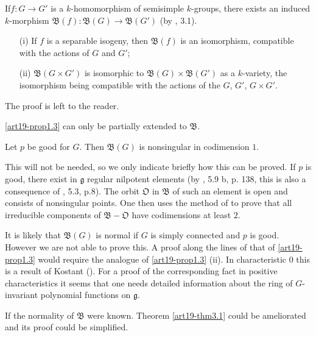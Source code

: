 If\pageoriginale $f:G\to G'$ is a $k$-homomorphism of semisimple $k$-groups, there exists an induced $k$-morphism $\mathfrak{B}(f):\mathfrak{B}(G)\to \mathfrak{B}(G')$ (by \cite{art19-key2}, 3.1).

\begin{proposition}\label{art19-prop2.2}
\begin{itemize}
\item[\rm(i)] If $f$ is a separable isogeny, then $\mathfrak{B}(f)$ is an isomorphism, compatible with the actions of $G$ and $G'$;

\item[\rm(ii)] $\mathfrak{B}(G\times G')$ is isomorphic to $\mathfrak{B}(G)\times \mathfrak{B}(G')$ as a $k$-variety, the isomorphism being compatible with the actions of the $G$, $G'$, $G\times G'$.
\end{itemize}
\end{proposition}

The proof is left to the reader.

\ref{art19-prop1.3} can only be partially extended to $\mathfrak{B}$.

\begin{proposition}\label{prop2.3}
Let $p$ be good for $G$. Then $\mathfrak{B}(G)$ is nonsingular in codimension $1$.
\end{proposition}

This will not be needed, so we only indicate briefly how this can be proved. If $p$ is good, there exist in $\mathfrak{g}$ regular nilpotent elements (by \cite{art19-key14}, 5.9 b, p. 138, this is also a consequence of \cite{art19-key10}, 5.3, p.8). The orbit $\mathfrak{O}$ in $\mathfrak{B}$ of such an element is open and consists of nonsingular points. One then uses the method of \cite{art19-key15} to prove that all irreducible components of $\mathfrak{B}-\mathfrak{O}$ have codimensions at least $2$.

It is likely that $\mathfrak{B}(G)$ is normal if $G$ is simply connected and $p$ is good. However we are not able to prove this. A proof along the lines of that of \ref{art19-prop1.3} would require the analogue of \ref{art19-prop1.3} (ii). In characteristic $0$ this is a result of Kostant (\cite{art19-key9}). For a proof of the corresponding fact in positive characteristics it seems that one needs detailed information about the ring of $G$-invariant polynomial functions on $\mathfrak{g}$.

If the normality of $\mathfrak{B}$ were known. Theorem \ref{art19-thm3.1} could be ameliorated and its proof could be simplified.

